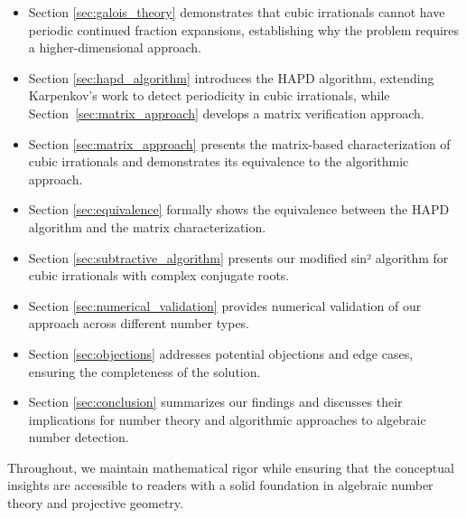 \begin{itemize}
    \item Section \ref{sec:galois_theory} demonstrates that cubic irrationals cannot have periodic continued fraction expansions, establishing why the problem requires a higher-dimensional approach.
    
    \item Section \ref{sec:hapd_algorithm} introduces the HAPD algorithm, extending Karpenkov's work to detect periodicity in cubic irrationals, while Section~\ref{sec:matrix_approach} develops a matrix verification approach.
    
    \item Section \ref{sec:matrix_approach} presents the matrix-based characterization of cubic irrationals and demonstrates its equivalence to the algorithmic approach.
    
    \item Section \ref{sec:equivalence} formally shows the equivalence between the HAPD algorithm and the matrix characterization.
    
    \item Section \ref{sec:subtractive_algorithm} presents our modified sin² algorithm for cubic irrationals with complex conjugate roots.
    
    \item Section \ref{sec:numerical_validation} provides numerical validation of our approach across different number types.
    
    \item Section \ref{sec:objections} addresses potential objections and edge cases, ensuring the completeness of the solution.
    
    \item Section \ref{sec:conclusion} summarizes our findings and discusses their implications for number theory and algorithmic approaches to algebraic number detection.
\end{itemize}

Throughout, we maintain mathematical rigor while ensuring that the conceptual insights are accessible to readers with a solid foundation in algebraic number theory and projective geometry.
